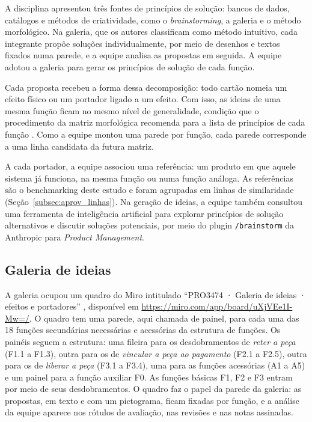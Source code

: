 A disciplina apresentou três fontes de princípios de solução: bancos de dados, catálogos e métodos de criatividade, como o \textit{brainstorming}, a galeria e o método morfológico. Na galeria, que os autores classificam como método intuitivo, cada integrante propõe soluções individualmente, por meio de desenhos e textos fixados numa parede, e a equipe analisa as propostas em seguida. A equipe adotou a galeria para gerar os princípios de solução de cada função.

Cada proposta recebeu a forma dessa decomposição: todo cartão nomeia um efeito físico ou um portador ligado a um efeito. Com isso, as ideias de uma mesma função ficam no mesmo nível de generalidade, condição que o procedimento da matriz morfológica recomenda para a lista de princípios de cada função \cite[Quadro 7.4]{rozenfeld2006gestao}. Como a equipe montou uma parede por função, cada parede corresponde a uma linha candidata da futura matriz.

A cada portador, a equipe associou uma referência: um produto em que aquele sistema já funciona, na mesma função ou numa função análoga. As referências são o benchmarking deste estudo e foram agrupadas em linhas de similaridade (Seção~\ref{subsec:aprov_linhas}). Na geração de ideias, a equipe também consultou uma ferramenta de inteligência artificial para explorar princípios de solução alternativos e discutir soluções potenciais, por meio do plugin \texttt{/brainstorm} da Anthropic para \textit{Product Management}.

\subsection{Galeria de ideias}
\label{subsec:aprov_galeria}

A galeria ocupou um quadro do Miro intitulado ``PRO3474 · Galeria de ideias · efeitos e portadores'' \cite{grupo42026galeria}, disponível em \url{https://miro.com/app/board/uXjVEe1I-Mw=/}. O quadro tem uma parede, aqui chamada de painel, para cada uma das 18 funções secundárias necessárias e acessórias da estrutura de funções. Os painéis seguem a estrutura: uma fileira para os desdobramentos de \emph{reter a peça} (F1.1 a F1.3), outra para os de \emph{vincular a peça ao pagamento} (F2.1 a F2.5), outra para os de \emph{liberar a peça} (F3.1 a F3.4), uma para as funções acessórias (A1 a A5) e um painel para a função auxiliar F0. As funções básicas F1, F2 e F3 entram por meio de seus desdobramentos. O quadro faz o papel da parede da galeria: as propostas, em texto e com um pictograma, ficam fixadas por função, e a análise da equipe aparece nos rótulos de avaliação, nas revisões e nas notas assinadas.

